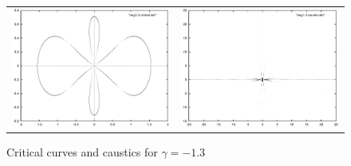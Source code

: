 \documentclass[a4paper]{IEEEtran}
\begin{document}
    \begin{figure}
        \caption{Critical curves and caustics for $\gamma = -1.3$}
        \label{fig:critical-gamma-1-3} 
        \begin{center}
            \begin{tabular}{cc}
                \includegraphics[width=\columnwidth]{images/neg1-3-critical.eps}  &
                \includegraphics[width=\columnwidth]{images/neg1-3-caustic.eps} 
            \end{tabular} 
        \end{center}
    \end{figure}
\end{document}

